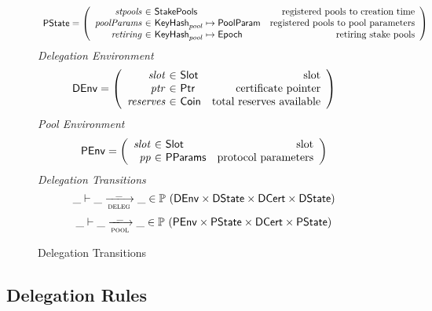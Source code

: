 \begin{figure}
\begin{equation*}
\begin{array}{l}
    \PState =
    \left(\begin{array}{r@{~\in~}lr}
      \var{stpools} & \StakePools & \text{registered pools to creation time}\\
      \var{poolParams} & \KeyHash_{pool} \mapsto \PoolParam
        & \text{registered pools to pool parameters}\\
      \var{retiring} & \KeyHash_{pool} \mapsto \Epoch & \text{retiring stake pools}\\
    \end{array}\right)
    \end{array}
  \end{equation*}
  \emph{Delegation Environment}
  \begin{equation*}
    \DEnv =
    \left(
      \begin{array}{r@{~\in~}lr}
        \var{slot} & \Slot & \text{slot}\\
        \var{ptr} & \Ptr & \text{certificate pointer}\\
        \var{reserves} & \Coin & \text{total reserves available}
      \end{array}
    \right)
  \end{equation*}
  \emph{Pool Environment}
  \begin{equation*}
    \PEnv =
    \left(
      \begin{array}{r@{~\in~}lr}
        \var{slot} & \Slot & \text{slot}\\
        \var{pp} & \PParams & \text{protocol parameters}\\
      \end{array}
    \right)
  \end{equation*}
  \emph{Delegation Transitions}
  \begin{equation*}
    \_ \vdash \_ \trans{deleg}{\_} \_ \in
      \powerset (\DEnv \times \DState \times \DCert \times \DState)
  \end{equation*}
  \begin{equation*}
    \_ \vdash \_ \trans{pool}{\_} \_ \in
    \powerset (\PEnv \times \PState \times \DCert \times \PState)
  \end{equation*}
  \caption{Delegation Transitions}
  \label{fig:delegation-transitions}
\end{figure}

\clearpage

\subsection{Delegation Rules}
\label{sec:deleg-rules}


